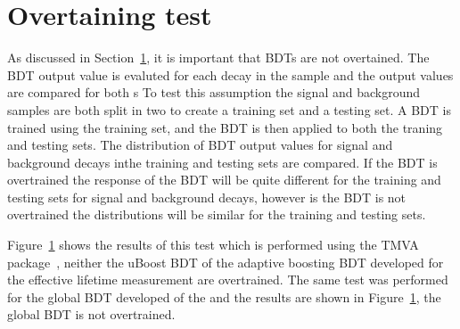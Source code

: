 \section{Overtaining test}
As discussed in Section~\ref{}, it is important that BDTs are not overtained. %
The BDT output value is evaluted for each decay in the sample and the output values are compared for both s
To test this assumption the signal and background samples are both split in two to create a training set and a testing set.
A BDT is trained using the training set, and the BDT is then applied to both the traning and testing sets. The distribution of BDT output values for signal and background decays inthe training and testing sets are compared. If the BDT is overtrained the response of the BDT will be quite different for the training and testing sets for signal and background decays, however is the BDT is not overtrained the distributions will be similar for the training and testing sets. 

Figure~\ref{} shows the results of this test which is performed using the TMVA package~\cite{}, neither the uBoost BDT of the adaptive boosting BDT developed for the effective lifetime measurement are overtrained. The same test was performed for the global BDT developed of the \BFm and the results are shown in Figure~\ref{}, the global BDT is not overtrained.  

